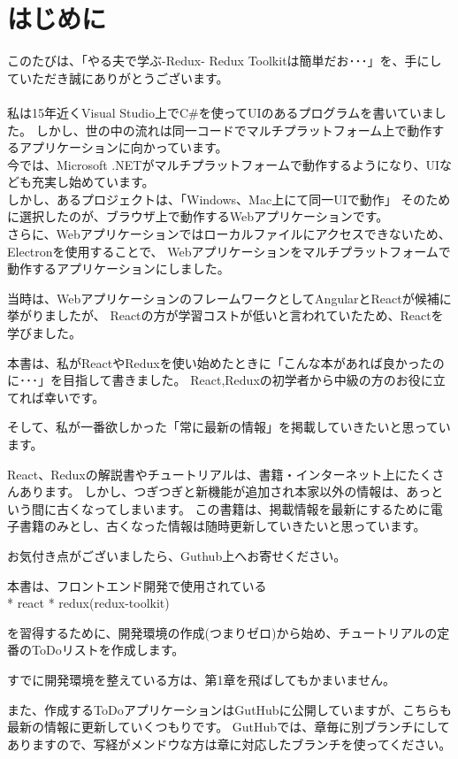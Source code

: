 \chapter{はじめに}
\label{chap:00-preface}

このたびは、「やる夫で学ぶ{-}Redux{-} Redux Toolkitは簡単だお･･･」を、手にしていただき誠にありがとうございます。
\\[0pt]
\\[0pt]
私は15年近くVisual Studio上でC\#を使ってUIのあるプログラムを書いていました。
しかし、世の中の流れは同一コードでマルチプラットフォーム上で動作するアプリケーションに向かっています。
\\[0pt]
今では、Microsoft .NETがマルチプラットフォームで動作するようになり、UIなども充実し始めています。
\\[0pt]
しかし、あるプロジェクトは、「Windows、Mac上にて同一UIで動作」
そのために選択したのが、ブラウザ上で動作するWebアプリケーションです。
\\[0pt]
さらに、Webアプリケーションではローカルファイルにアクセスできないため、Electronを使用することで、
Webアプリケーションをマルチプラットフォームで動作するアプリケーションにしました。

当時は、WebアプリケーションのフレームワークとしてAngularとReactが候補に挙がりましたが、
Reactの方が学習コストが低いと言われていたため、Reactを学びました。

本書は、私がReactやReduxを使い始めたときに「こんな本があれば良かったのに･･･」を目指して書きました。
React,Reduxの初学者から中級の方のお役に立てれば幸いです。

そして、私が一番欲しかった「常に最新の情報」を掲載していきたいと思っています。

React、Reduxの解説書やチュートリアルは、書籍・インターネット上にたくさんあります。
しかし、つぎつぎと新機能が追加され本家以外の情報は、あっという間に古くなってしまいます。
この書籍は、掲載情報を最新にするために電子書籍のみとし、古くなった情報は随時更新していきたいと思っています。

お気付き点がございましたら、Guthub上へお寄せください。

本書は、フロントエンド開発で使用されている\\[0pt]
* react
* redux(redux{-}toolkit)

を習得するために、開発環境の作成(つまりゼロ)から始め、チュートリアルの定番のToDoリストを作成します。

すでに開発環境を整えている方は、第1章を飛ばしてもかまいません。

また、作成するToDoアプリケーションはGutHubに公開していますが、こちらも最新の情報に更新していくつもりです。
GutHubでは、章毎に別ブランチにしてありますので、写経がメンドウな方は章に対応したブランチを使ってください。

